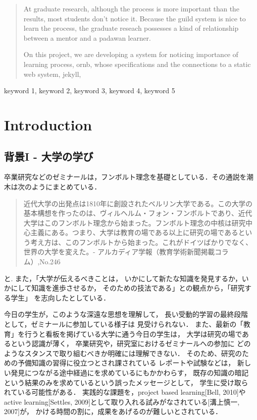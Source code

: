 \documentclass{hissymp}
\author{bob}
\date{}
\begin{document}
\begin{abstract}
\label{sec:org1810b24}
At graduate research, 
although the process is more important than the results,
most students don't notice it.
Because the guild system is nice to learn the process,
the graduate reseach possesses a kind of
relationship between 
a mentor and a padawan learner.

On this project, 
we are developing a system for
noticing importance of learning process,
ornb, whose specifications and 
the connections to a static web system, jekyll,


\end{abstract}

\begin{keyword}
keyword 1, keyword 2, keyword 3, keyword 4, keyword 5
\end{keyword}

\maketitle
\section{Introduction}

\label{sec:orgaa6387a}
\subsection{背景I - 大学の学び}
\label{sec:org3153d37}
卒業研究などのゼミナールは，フンボルト理念を基礎としている．その通説を潮木は次のようにまとめている．
\begin{quote}
近代大学の出発点は1810年に創設されたベルリン大学である。この大学の基本構想を作ったのは、ヴィルヘルム・フォン・フンボルトであり、近代大学はこのフンボルト理念から始まった。フンボルト理念の中核は研究中心主義にある。つまり、大学は教育の場である以上に研究の場であるという考え方は、このフンボルトから始まった。これがドイツばかりでなく、世界の大学を変えた。- アルカディア学報（教育学術新聞掲載コラム）,No.246
\end{quote}
と. また，「大学が伝えるべきことは，
いかにして新たな知識を発見するか，いかにして知識を進歩させるか，
そのための技法である」との観点から，「研究する学生」
を志向したとしている．

今日の学生が，このような深遠な思想を理解して，
長い受動的学習の最終段階として，ゼミナールに参加している様子は
見受けられない．
また、最新の「教育」を行うと看板を掲げている大学に通う今日の学生は，
大学は研究の場であるという認識が薄く，
卒業研究や，研究室におけるゼミナールへの参加に
どのようなスタンスで取り組むべきか明確には理解できない．
そのため、研究のための予備知識の習得に役立つとされ課されている
レポートや試験などは，
新しい発見につながる途中経過にを求めているにもかかわらす，
既存の知識の暗記という結果のみを求めているという誤ったメッセージとして，
学生に受け取られている可能性がある．
実践的な課題を，project based learning[Bell, 2010]や
active learning[Settles, 2009]として取り入れる試みがなされている[溝上慎一, 2007]が，
かける時間の割に，成果をあげるのが難しいとされている．
\end{document}
